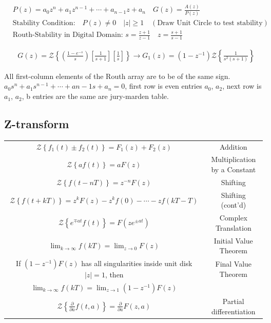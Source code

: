 \begin{align*}
& P(z) = a_0z^n+a_1z^{n-1} + \cdots + a_{n-1}z+a_n \quad G(z)= \frac{A(z)}{P(z)} \\
& \text{Stability Condition:} \quad P(z) \neq 0 \quad |z| \geq 1 \quad (\text{Draw Unit Circle to test stability})\\
& \text{Routh-Stability in Digital Domain: } s = \frac{z+1}{z-1} \quad z=\frac{s+1}{s-1}
\end{align*}


\begin{align*}
& G(z) = \mathcal{Z} \left\{\left(\frac{1-e^{-s}}{s}\right) \left[ \frac{1}{s+1}\right] \left[\frac{1}{s}\right] \right\} \rightarrow G_1(z) = (1-z^{-1})\mathcal{Z} \left\{ \frac{1}{s^2(s+1)} \right\}
\end{align*}

All first-column elements of the Routh array are to be of the same sign. $a_0s^n + a_1s^{n-1}+ \cdots + a{n-1} s + a_n = 0$, first row is even entries $a_0$, $a_2$, next row is $a_1$, $a_2$, b entries are the same are jury-marden table.


\subsection{Z-transform}



\begin{tabular}{c c}
	$\mathcal{Z} \left\{ f_1(t) \pm f_2(t) \right\}=F_1(z)+F_2(z)$ & Addition\\
	$\mathcal{Z} \left\{ af(t) \right\}= aF(z)$ & Multiplication by a Constant \\
	$\mathcal{Z} \left\{ f(t-nT) \right\}=z^{-n}F(z)$ & Shifting \\
	$\mathcal{Z} \left\{ f(t+kT) \right\}=z^{k}F(z)-z^{k}f(0)- \cdots - z f(kT-T)$ & Shifting (cont'd) \\
	$\mathcal{Z} \left\{ e^{\mp at} f(t) \right\}=F(ze^{\pm at})$ & Complex Translation \\
	$\lim_{k \rightarrow \infty} f(kT)= \lim_{z \rightarrow 0}F(z)$ & Initial Value Theorem \\ 
	If $(1-z^{-1})F(z)$ has all singularities inside unit disk $|z|=1$, then & Final Value Theorem \\
	$\lim_{k \rightarrow \infty} f(kT) = \lim_{z \rightarrow 1} (1-z^{-1})F(z)$ & \\
	$\mathcal{Z} \left\{ \frac{\partial}{\partial a} f(t,a) \right\} = \frac{\partial}{\partial a} F(z,a)$ & Partial differentiation
\end{tabular}

